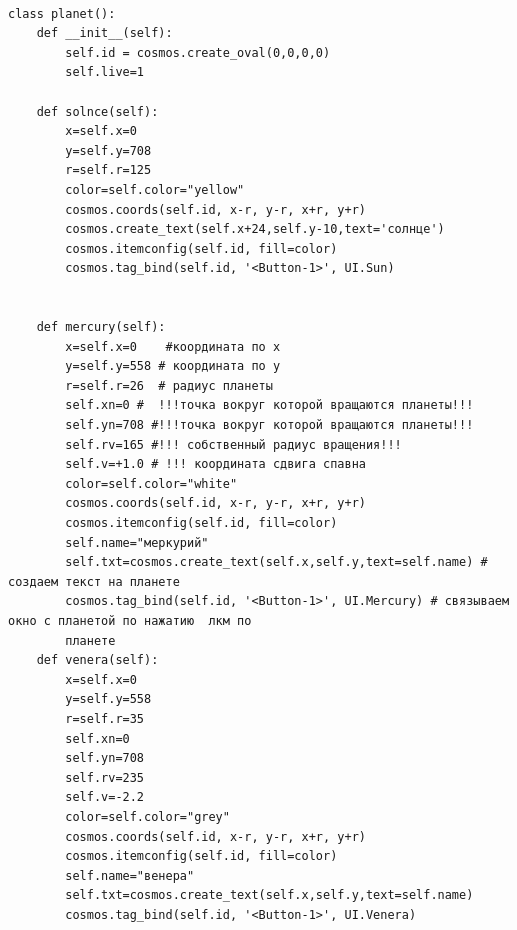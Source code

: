 \documentclass[11pt,a4paper]{report}
\begin{document}
\begin{verbatim}
     
class planet():
    def __init__(self):
        self.id = cosmos.create_oval(0,0,0,0)
        self.live=1
        
    def solnce(self):
        x=self.x=0
        y=self.y=708
        r=self.r=125
        color=self.color="yellow"
        cosmos.coords(self.id, x-r, y-r, x+r, y+r)
        cosmos.create_text(self.x+24,self.y-10,text='солнце')
        cosmos.itemconfig(self.id, fill=color)
        cosmos.tag_bind(self.id, '<Button-1>', UI.Sun)
      
        
    def mercury(self):
        x=self.x=0    #координата по х
        y=self.y=558 # координата по у
        r=self.r=26  # радиус планеты
        self.xn=0 #  !!!точка вокруг которой вращаются планеты!!!
        self.yn=708 #!!!точка вокруг которой вращаются планеты!!!
        self.rv=165 #!!! собственный радиус вращения!!!
        self.v=+1.0 # !!! координата сдвига спавна 
        color=self.color="white"
        cosmos.coords(self.id, x-r, y-r, x+r, y+r)
        cosmos.itemconfig(self.id, fill=color) 
        self.name="меркурий"
        self.txt=cosmos.create_text(self.x,self.y,text=self.name) # создаем текст на планете
        cosmos.tag_bind(self.id, '<Button-1>', UI.Mercury) # связываем окно с планетой по нажатию  лкм по 
        планете
    def venera(self):
        x=self.x=0
        y=self.y=558
        r=self.r=35
        self.xn=0
        self.yn=708
        self.rv=235
        self.v=-2.2
        color=self.color="grey"
        cosmos.coords(self.id, x-r, y-r, x+r, y+r)
        cosmos.itemconfig(self.id, fill=color)
        self.name="венера"
        self.txt=cosmos.create_text(self.x,self.y,text=self.name)
        cosmos.tag_bind(self.id, '<Button-1>', UI.Venera)
    

\end{verbatim}
\end{document}
